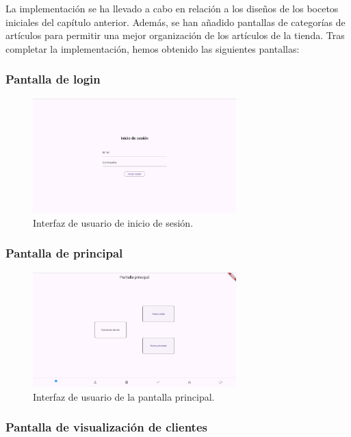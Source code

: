 La implementación se ha llevado a cabo en relación a los diseños de los bocetos iniciales del capítulo anterior. Además, se han añadido pantallas de categorías de artículos para permitir una mejor organización de los artículos de la tienda. Tras completar la implementación, hemos obtenido las siguientes pantallas: 

\subsubsection{Pantalla de login}

\begin{figure}[H]
	\centering
	\includegraphics[width=0.7\textwidth]{imagenes/PrimeraIteracion/inicioSesion.png}
	\caption{Interfaz de usuario de inicio de sesión.}
	\label{fig:appInicioSesion}
\end{figure}

\subsubsection{Pantalla de principal}

\begin{figure}[H]
	\centering
	\includegraphics[width=0.7\textwidth]{imagenes/PrimeraIteracion/pantallaPrincipal.png}
	\caption{Interfaz de usuario de la pantalla principal.}
	\label{fig:appPantallaPrincipal}
\end{figure}

\subsubsection{Pantalla de visualización de clientes}

